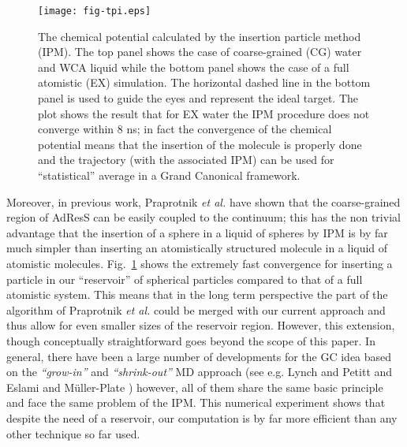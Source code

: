\documentclass[aip,jcp,a4paper,reprint,onecolumn]{revtex4-1}
\begin{document}
\begin{figure}
  \centering
  \texttt{[image: fig-tpi.eps]}
  \caption{The chemical potential calculated by the insertion particle method (IPM). The top panel shows the case of coarse-grained (CG) water and WCA liquid while the bottom panel shows the case of a full atomistic (EX) simulation. The horizontal dashed line in the bottom panel
        is used to guide the eyes and represent the ideal target. The plot shows
        the result that for EX water the IPM procedure does not converge within 8 \textsf{ns};
      in fact the convergence of the chemical potential means that the insertion of the molecule is properly done and the trajectory (with the associated IPM) can be used for ``statistical'' average in a Grand Canonical framework.}
  \label{fig:tmp4}
\end{figure}
Moreover, in previous work, Praprotnik {\it et al.} \cite{delgado2009coupling} have shown that the coarse-grained region of AdResS can be easily coupled to the continuum; this has the non trivial advantage that the insertion of a sphere in a liquid of spheres by IPM is by far much simpler than inserting an atomistically structured molecule in a liquid of atomistic molecules. Fig.~\ref{fig:tmp4} shows the extremely fast convergence for inserting a particle in our ``reservoir'' of spherical particles compared to that of a full atomistic system. This means that in the long term perspective the part of the algorithm of Praprotnik {\it et al.} could be merged with our current approach and thus allow for even smaller sizes of the reservoir region. However, this extension, though conceptually straightforward goes beyond the scope of this paper. In general, there have been a large number of developments for the GC idea based on the {\it ``grow-in''} and {\it ``shrink-out''} MD approach (see e.g. Lynch and Petitt \cite{pet5} and Eslami and M\"uller-Plate \cite{flo}) however, all of them  share the same basic principle and face the same problem of the IPM. This numerical experiment shows that despite the need of a reservoir, our computation is by far more efficient than any other technique so far used.
 
\end{document}
